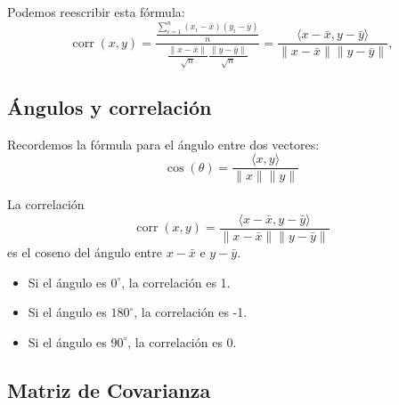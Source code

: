 \documentclass[a4paper]{article}
\DeclareMathOperator{\corr}{corr}
\begin{document}
Podemos reescribir esta fórmula:
$$
\corr(x,y) = \frac{\frac{\sum_{i = 1}^n (x_i - \bar x)(y_i - \bar y)}{n}}{\frac{\|x  - \bar x\|}{\sqrt{n}}\frac{\|y - \bar y\|}{\sqrt{n}}} = \frac{\langle x - \bar x, y - \bar y\rangle}{\|x - \bar x\|\|y  - \bar y\|},
$$

\subsection{\'Angulos y correlaci\'on}

\begin{minipage}{.45\textwidth}
Recordemos la fórmula para el ángulo entre dos vectores:
$$
\cos(\theta) = \frac{\langle x, y \rangle}{\|x\|\|y\|}
$$
\end{minipage} \hspace{.4cm} %
\begin{minipage}{.45\textwidth}
\end{minipage}

La correlación 
$$\corr(x, y) = \frac{\langle x - \bar x, y - \bar y \rangle}{\|x - \bar x\|\|y - \bar y\|}$$
 es el coseno del ángulo entre $x - \bar x$ e $y - \bar y$.

\begin{itemize}
\item Si el ángulo es $0^\circ$, la correlación es 1.
\item Si el ángulo es $180^\circ$, la correlación es -1.
\item Si el ángulo es $90^\circ$, la correlación es 0.
\end{itemize}

\subsection{Matriz de Covarianza}
\end{document}
